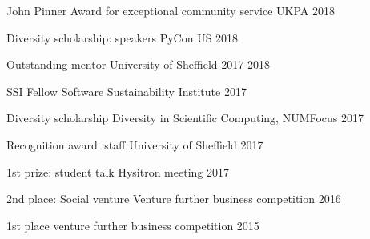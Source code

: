 




\begin{cvpress}

\cvpres
{John Pinner Award for exceptional community service} %
{UKPA}
{2018}


\cvpres
{Diversity scholarship: speakers} %
{PyCon US}
{2018}

\cvpres
{Outstanding mentor} %
{University of Sheffield}
{2017-2018}

\cvpres
{SSI Fellow} %
{Software Sustainability Institute}
{2017}

\cvpres
{Diversity scholarship} %
{Diversity in Scientific Computing, NUMFocus}
{2017}

\cvpres
{Recognition award: staff} %
{University of Sheffield}
{2017}


\cvpres
{1st prize: student talk}
{Hysitron meeting}
{2017}




\cvpres
{2nd place: Social venture}
{Venture further business competition}
{2016}



\cvpres
{1st place}
{venture further business competition}
{2015}




\end{cvpress}
